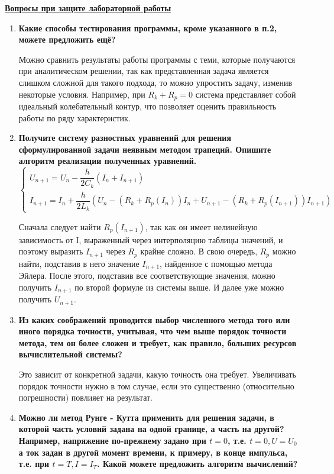 \underline{\textbf{Вопросы при защите лабораторной работы}}\\

\begin{enumerate}
\item \textbf{Какие способы тестирования программы, кроме указанного в п.2, можете предложить ещё?}

Можно сравнить результаты работы программы с теми, которые получаются при аналитическом решении, так как представленная задача является слишком сложной для такого подхода, то можно упростить задачу, изменив некоторые условия. Например, при $R_k + R_p = 0$ система представляет собой идеальный колебательный контур, что позволяет оценить правильность работы по ряду характеристик.  

\item \textbf{Получите систему разностных уравнений для решения сформулированной задачи неявным методом трапеций. Опишите алгоритм реализации полученных уравнений.}
\begin{equation}
	\left\{
	\begin{array}{ccc}
	U_{n + 1} = U_n - \dfrac{h}{2 C_k}(I_n + I_{n + 1}) \\
	I_{n + 1} = I_n + \dfrac{h}{2 L_k}(U_n - (R_k + R_p(I_n)) I_n + U_{n + 1} - (R_k + R_p(I_{n + 1})) I_{n + 1})
\end{array}
\right.
\end{equation}

Сначала следует найти $R_p({I_{n + 1}})$, так как он имеет нелинейную зависимость от I, выраженный через интерполяцию таблицы значений, и поэтому выразить $I_{n + 1}$ через $R_p$ крайне сложно. В свою очередь, $R_p$ можно найти, подставив в него значение $I_{n + 1}$, найденное с помощью метода Эйлера. После этого, подставив все соответствующие значения, можно получить $I_{n + 1}$ по второй формуле из системы выше. И далее уже можно получить $U_{n + 1}$.

\item \textbf{Из каких соображений проводится выбор численного метода того или иного порядка точности, учитывая, что чем выше порядок точности метода, тем он более сложен и требует, как правило, больших ресурсов вычислительной системы?}

Это зависит от конкретной задачи, какую точность она требует. Увеличивать порядок точности нужно в том случае, если это существенно (относительно погрешности) повлияет на результат.


\item \textbf{Можно ли метод Рунге - Кутта применить для решения задачи, в которой часть условий задана на одной границе, а часть на другой? Например, напряжение по-прежнему задано при $t = 0$, т.е. $t = 0, U = U_0$ а ток задан в другой момент времени, к примеру, в конце импульса, т.е. при $t = T, I = I_T$. Какой можете предложить алгоритм вычислений?}


\end{enumerate}
